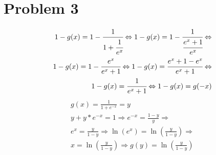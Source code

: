 \section{Problem 3}
\begin{align*}
1-g(x) = 1 - \cfrac{1}{1+\cfrac{1}{{e^x}}} \Leftrightarrow 
1-g(x) = 1 - \cfrac{1}{\cfrac{e^x + 1}{e^x}} \Leftrightarrow \\
1-g(x) = 1 - \cfrac{e^x}{e^x + 1} \Leftrightarrow 
1-g(x) = \cfrac{e^x+1-e^x}{e^x+1} \Leftrightarrow \\
1-g(x) = \cfrac{1}{e^x+1} \Leftrightarrow 
1-g(x) = g(-x)
\end{align*}
\begin{align*}
g(x) = \frac{1}{1+e^{-x}} = y \\
y+y*e^{-x} = 1 \Rightarrow 
e^{-x} = \frac{1-y}{y} \Rightarrow \\
e^x = \frac{y}{1-y} \Rightarrow 
\ln(e^x) = \ln(\frac{y}{1-y}) \Rightarrow \\
x = \ln(\frac{y}{1-y}) \Rightarrow 
g(y) = \ln(\frac{y}{1-y})
\end{align*}
